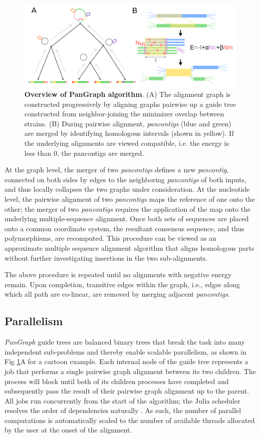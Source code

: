 \documentclass[aps,rmp,reprint,superscriptaddress,notitlepage,10pt]{revtex4-1}
\begin{document}
\begin{figure}[htb]
    \includegraphics[width=.45\textwidth]{figs/algorithm.pdf}
    \caption{{\bf Overview of PanGraph algorithm}.
        (A) The alignment graph is constructed progressively by aligning graphs pairwise up a guide tree constructed from neighbor-joining the minimizer overlap between strains.
        (B) During pairwise alignment, \emph{pancontigs} (blue and green)
        are merged by identifying homologous intervals (shown in yellow).
        If the underlying alignments are viewed compatible, i.e. the energy is less than 0, the pancontigs are merged.
    }
    \label{fig:visualization}
\end{figure}

At the graph level, the merger of two \emph{pancontigs} defines a new \emph{pancontig}, connected on both sides by edges to the neighboring \emph{pancontigs} of both inputs, and thus locally collapses the two graphs under consideration.
At the nucleotide level, the pairwise alignment of two \emph{pancontigs} maps the reference of one onto the other; the merger of two \emph{pancontigs} requires the application of the map onto the underlying multiple-sequence alignment.
Once both sets of sequences are placed onto a common coordinate system, the resultant consensus sequence, and thus polymorphisms, are recomputed.
This procedure can be viewed as an approximate multiple sequence alignment algorithm that aligns homologous parts without further investigating insertions in the two sub-alignments.

The above procedure is repeated until no alignments with negative energy remain.
Upon completion, transitive edges within the graph, i.e., edges along which all path are co-linear, are removed by merging adjacent \emph{pancontigs}.

\subsection{Parallelism}
\emph{PanGraph} guide trees are balanced binary trees that break the task into many independent sub-problems and thereby enable scalable parallelism, as shown in Fig \ref{fig:visualization}A for a cartoon example.
Each internal node of the guide tree represents a job that performs a single pairwise graph alignment between its two children.
The process will block until both of its children processes have completed and subsequently pass the result of their pairwise graph alignment up to the parent.
All jobs run concurrently from the start of the algorithm; the Julia scheduler resolves the order of dependencies naturally \cite{bezanson2017julia}.
As such, the number of parallel computations is automatically scaled to the number of available threads allocated by the user at the onset of the alignment.
\end{document}
